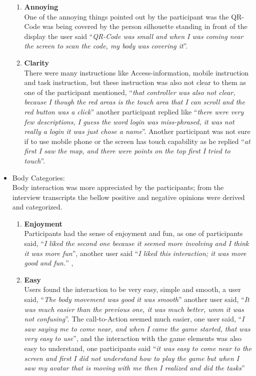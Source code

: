\begin{itemize}
\begin{enumerate}
\item	\textbf{Annoying}\\
One of the annoying things pointed out by the participant was the QR-Code was being covered by the person silhouette standing in front of the display the user said ``\emph{QR-Code was small and when I was coming near the screen to scan the code, my body was covering it}''.

\item	\textbf{Clarity}\\
There were many instructions like Access-information, mobile instruction and task instruction, but these instruction was also not clear to them as one of the participant mentioned, ``\emph{that controller was also not clear, because I though the red areas is the touch area that I can scroll and the red button was a click}'' another participant replied like ``\emph{there were very few descriptions, I guess the word login was miss-phrased, it was not really a login it was just chose a name}''. Another participant was not sure if to use mobile phone or the screen has touch capability as he replied ``\emph{at first I saw the map, and there were points on the top first I tried to touch}''.


\end{enumerate}


\item Body Categories: \\
Body interaction was more appreciated by the participants; from the interview transcripts the bellow positive and negative opinions were derived and categorized.

\begin{enumerate}
\item	\textbf{Enjoyment}\\
Participants had the sense of enjoyment and fun, as one of participants said, ``\emph{I liked the second one because it seemed more involving and I think it was more fun}'', another user said ``\emph{I liked this interaction; it was more good and fun.}'' , 

\item	\textbf{Easy}\\
Users found the interaction to be very easy, simple and smooth, a user said, ``\emph{The body movement was good it was smooth}'' another user said, ``\emph{It was much easier than the previous one, it was much better, umm it was not confusing}''. The call-to-Action seemed much easier, one user said, ``\emph{I saw saying me to come near, and when I came the game started, that was very easy to use}'', and the interaction with the game elements was also easy to understand, one participants said ``\emph{it was easy to come near to the screen and first I did not understand how to play the game but when I saw my avatar that is moving with me then I realized and did the tasks}''


\end{enumerate}
\end{itemize}
